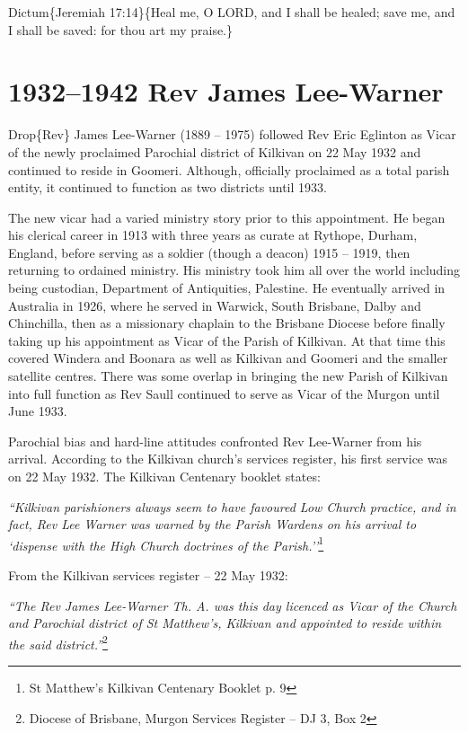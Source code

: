 Dictum\{Jeremiah 17:14\}\{Heal me, O LORD, and I shall be healed; save me, and I shall be saved: for thou art my praise.\}

\hypertarget{rev-james-lee-warner}{%
\chapter{1932--1942 Rev James Lee-Warner}\label{rev-james-lee-warner}}

Drop\{Rev\} James Lee-Warner (1889 -- 1975) followed Rev Eric Eglinton as Vicar of the newly proclaimed Parochial district of Kilkivan on 22 May 1932 and continued to reside in Goomeri. Although, officially proclaimed as a total parish entity, it continued to function as two districts until 1933.

The new vicar had a varied ministry story prior to this appointment. He began his clerical career in 1913 with three years as curate at Rythope, Durham, England, before serving as a soldier (though a deacon) 1915 -- 1919, then returning to ordained ministry. His ministry took him all over the world including being custodian, Department of Antiquities, Palestine. He eventually arrived in Australia in 1926, where he served in Warwick, South Brisbane, Dalby and Chinchilla, then as a missionary chaplain to the Brisbane Diocese before finally taking up his appointment as Vicar of the Parish of Kilkivan. At that time this covered Windera and Boonara as well as Kilkivan and Goomeri and the smaller satellite centres. There was some overlap in bringing the new Parish of Kilkivan into full function as Rev Saull continued to serve as Vicar of the Murgon until June 1933.

Parochial bias and hard-line attitudes confronted Rev Lee-Warner from his arrival. According to the Kilkivan church's services register, his first service was on 22 May 1932. The Kilkivan Centenary booklet states:

\emph{``Kilkivan parishioners always seem to have favoured Low Church practice, and in fact, Rev Lee Warner was warned by the Parish Wardens on his arrival to `dispense with the High Church doctrines of the Parish.''}\footnote{St Matthew's Kilkivan Centenary Booklet p. 9}

From the Kilkivan services register -- 22 May 1932:

\emph{``The Rev James Lee-Warner Th. A. was this day licenced as Vicar of the Church and Parochial district of St Matthew's, Kilkivan and appointed to reside within the said district.''}\footnote{Diocese of Brisbane, Murgon Services Register -- DJ 3, Box 2}

